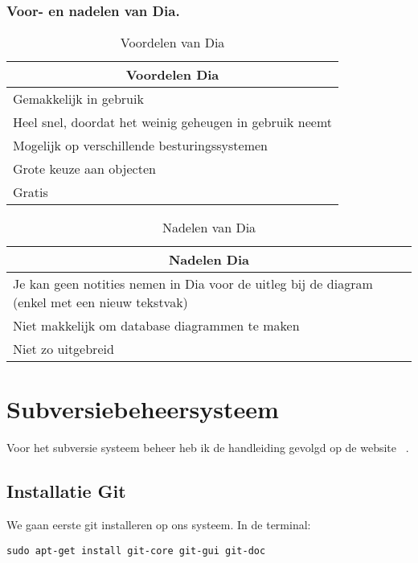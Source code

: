 \documentclass[11pt]{report}
\begin{document}
\subsection{Voor- en nadelen van Dia.}
\begin{table}[h!]
\caption{Voordelen van Dia}
\centering
\begin{tabular}{|p{10cm}|} \hline
\multicolumn{1}{|c|}{Voordelen Dia} \\ \hline \hline
Gemakkelijk in gebruik \\  \hline
Heel snel, doordat het weinig geheugen in gebruik neemt\\  \hline
Mogelijk op verschillende besturingssystemen\\  \hline
Grote keuze aan objecten \\  \hline
Gratis \\  \hline
\end{tabular}
\end{table}
\begin{table}[h!]
\caption{Nadelen van Dia}
\centering
\begin{tabular}{|p{10cm}|} \hline
\multicolumn{1}{|c|}{Nadelen Dia} \\ \hline \hline
Je kan geen notities nemen in Dia voor de uitleg bij de diagram (enkel met een nieuw tekstvak) \\  \hline
Niet makkelijk om database diagrammen te maken \\  \hline
Niet zo uitgebreid \\  \hline
\end{tabular}
\end{table}
\newpage
\appendix
\renewcommand*{\appendixname}{Bijlage}
\chapter{Subversiebeheersysteem}
Voor het subversie systeem beheer heb ik de handleiding gevolgd op de website ~\cite{SiteGit}.
\section{Installatie Git}
We gaan eerste git installeren op ons systeem.
In de terminal:
\begin{lstlisting}
sudo apt-get install git-core git-gui git-doc
\end{lstlisting}
\end{document}
